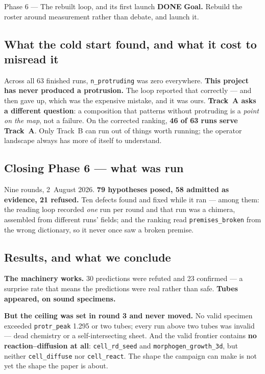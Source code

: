 \documentclass[11pt,a4paper]{article}
\newcommand{\code}[1]{\texttt{#1}}
\newcommand{\done}{\textcolor{good}{\textbf{DONE}}}
\begin{document}
\begin{phasebox}{Phase 6 --- The rebuilt loop, and its first launch \hfill \done}
\textbf{Goal.} Rebuild the roster around measurement rather than debate, and launch it.

\subsection*{What the cold start found, and what it cost to misread it}
Across all 63 finished runs, \code{n\_protruding} was zero everywhere. \textbf{This project has
never produced a protrusion.} The loop reported that correctly --- and then gave up, which was the
expensive mistake, and it was ours. \textbf{Track~A asks a different question}: a composition that
patterns without protruding is a \emph{point on the map}, not a failure. On the corrected ranking,
\textbf{46 of 63 runs serve Track~A}. Only Track~B can run out of things worth running; the
operator landscape always has more of itself to understand.

\subsection*{Closing Phase 6 --- what was run}
Nine rounds, 2~August 2026. \textbf{79 hypotheses posed, 58 admitted as evidence, 21 refused.} Ten
defects found and fixed while it ran --- among them: the reading loop recorded \emph{one} run per
round and that run was a chimera, assembled from different runs' fields; and the ranking read
\code{premises\_broken} from the wrong dictionary, so it never once saw a broken premise.

\subsection*{Results, and what we conclude}
\textbf{The machinery works.} 30 predictions were refuted and 23 confirmed --- a surprise rate that
means the predictions were real rather than safe. \textbf{Tubes appeared, on sound specimens.}

\textbf{But the ceiling was set in round 3 and never moved.} No valid specimen exceeded
\code{protr\_peak} 1.295 or two tubes; every run above two tubes was invalid --- dead chemistry or a
self-intersecting sheet. And the valid frontier contains \textbf{no reaction--diffusion at all}:
\code{cell\_rd\_seed} and \code{morphogen\_growth\_3d}, but neither \code{cell\_diffuse} nor
\code{cell\_react}. The shape the campaign can make is not yet the shape the paper is about.


\end{phasebox}
\end{document}
